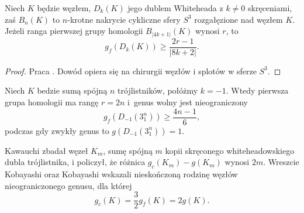\begin{proposition}
    Niech $K$ będzie węzłem, $D_k(K)$ jego dublem Whiteheada z $k \neq 0$ skręceniami, zaś $B_n(K)$ to $n$-krotne nakrycie cykliczne sfery $S^3$ rozgałęzione nad węzłem $K$.
    Jeżeli ranga pierwszej grupy homologii $B_{|4k+1|}(K)$ wynosi $r$, to
    \begin{equation}
        g_f(D_k(K)) \ge \frac {2r-1} {|8k+2|}.
    \end{equation}
\end{proposition}

\begin{proof}
    Praca \cite{moriah1987}.
    Dowód opiera się na chirurgii węzłów i splotów w sferze $S^3$.
\end{proof}

\begin{corollary}
    Niech $K$ bedzie sumą spójną $n$ trójlistników, połóżmy $k = -1$.
    Wtedy pierwsza grupa homologii ma rangę $r = 2n$ i~genus wolny jest nieograniczony
    \begin{equation}
        g_f(D_{-1}(3_1^n)) \ge \frac {4n-1} {6},
    \end{equation}
    podczas gdy zwykły genus to $g(D_{-1}(3_1^n)) = 1$.
\end{corollary}

Kawauchi \cite{kawauchi1994} zbadał węzeł $K_m$, sumę spójną $m$ kopii skręconego whiteheadowskiego dubla trójlistnika, i policzył, że różnica $g_c(K_m) - g(K_m)$ wynosi $2m$.
%
Wreszcie Kobayashi oraz Kobayashi \cite{kobayashi1996} wskazali nieskończoną rodzinę węzłów nieograniczonego genusu, dla której
%
%
\begin{equation}
    g_c(K) = \frac 32 g_f(K) = 2g(K).
\end{equation}


